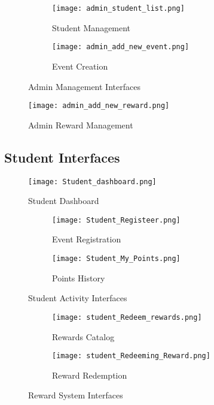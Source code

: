 \documentclass[12pt,a4paper]{report}
\begin{document}
\begin{figure}[H]
    \centering
    \begin{subfigure}[b]{0.48\textwidth}
        \texttt{[image: admin\_student\_list.png]}
        \caption{Student Management}
        \label{fig:admin-students}
    \end{subfigure}
    \hfill
    \begin{subfigure}[b]{0.48\textwidth}
        \texttt{[image: admin\_add\_new\_event.png]}
        \caption{Event Creation}
        \label{fig:admin-events}
    \end{subfigure}
    \caption{Admin Management Interfaces}
    \label{fig:admin-interfaces}
\end{figure}

\begin{figure}[H]
    \centering
    \texttt{[image: admin\_add\_new\_reward.png]}
    \caption{Admin Reward Management}
    \label{fig:admin-rewards}
\end{figure}

\subsection{Student Interfaces}
\begin{figure}[H]
    \centering
    \texttt{[image: Student\_dashboard.png]}
    \caption{Student Dashboard}
    \label{fig:student-dashboard}
\end{figure}

\begin{figure}[H]
    \centering
    \begin{subfigure}[b]{0.48\textwidth}
        \texttt{[image: Student\_Registeer.png]}
        \caption{Event Registration}
        \label{fig:student-register}
    \end{subfigure}
    \hfill
    \begin{subfigure}[b]{0.48\textwidth}
        \texttt{[image: Student\_My\_Points.png]}
        \caption{Points History}
        \label{fig:student-points}
    \end{subfigure}
    \caption{Student Activity Interfaces}
    \label{fig:student-interfaces}
\end{figure}

\begin{figure}[H]
    \centering
    \begin{subfigure}[b]{0.48\textwidth}
        \texttt{[image: student\_Redeem\_rewards.png]}
        \caption{Rewards Catalog}
        \label{fig:student-rewards}
    \end{subfigure}
    \hfill
    \begin{subfigure}[b]{0.48\textwidth}
        \texttt{[image: student\_Redeeming\_Reward.png]}
        \caption{Reward Redemption}
        \label{fig:student-redeem}
    \end{subfigure}
    \caption{Reward System Interfaces}
    \label{fig:reward-interfaces}
\end{figure}
\end{document}
